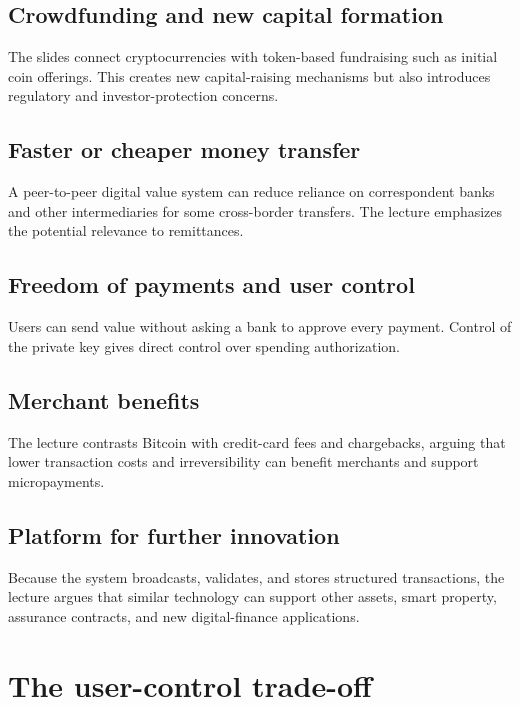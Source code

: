 \subsection{Crowdfunding and new capital formation}

The slides connect cryptocurrencies with token-based fundraising such as initial coin offerings. This creates new capital-raising mechanisms but also introduces regulatory and investor-protection concerns.

\subsection{Faster or cheaper money transfer}

A peer-to-peer digital value system can reduce reliance on correspondent banks and other intermediaries for some cross-border transfers. The lecture emphasizes the potential relevance to remittances.

\subsection{Freedom of payments and user control}

Users can send value without asking a bank to approve every payment. Control of the private key gives direct control over spending authorization.

\subsection{Merchant benefits}

The lecture contrasts Bitcoin with credit-card fees and chargebacks, arguing that lower transaction costs and irreversibility can benefit merchants and support micropayments.

\subsection{Platform for further innovation}

Because the system broadcasts, validates, and stores structured transactions, the lecture argues that similar technology can support other assets, smart property, assurance contracts, and new digital-finance applications.

\section{The user-control trade-off}

